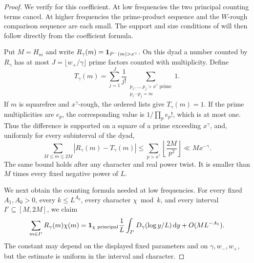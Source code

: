 \begin{proof}
We verify  for this
coefficient.  At low frequencies the two principal counting terms
cancel.  At higher frequencies the prime-product sequence and the
\(W\)-rough comparison sequence are each small.  The support and size
conditions of  will then follow
directly from the coefficient formula.

Put \(M=H_m\) and write \(R_\gamma(m)=\mathbf{1}_{P^-(m)>x^\gamma}\).
On this dyad a number counted by \(R_\gamma\) has at most
\(J=\lfloor w_+/\gamma\rfloor\) prime factors counted with multiplicity.
Define
\[
 T_\gamma(m)=\sum_{j=1}^{J}\frac1{j!}
       \sum_{\substack{p_1,\ldots,p_j>x^\gamma\text{ prime}\\
                       p_1\cdots p_j=m}}1.
\]
If \(m\) is squarefree and \(x^\gamma\)-rough, the ordered lists give
\(T_\gamma(m)=1\).  If the prime multiplicities are \(e_p\), the
corresponding value is \(1/\prod_p e_p!\), which is at most one.
Thus the difference is supported on a square of a prime exceeding
\(x^\gamma\), and, uniformly for every subinterval of the dyad,
\begin{equation}\label{eq:rough-convolution-square-error}
 \sum_{M\le m\le2M}|R_\gamma(m)-T_\gamma(m)|
 \le\sum_{p>x^\gamma}\left\lfloor\frac{2M}{p^2}\right\rfloor
 \ll Mx^{-\gamma}.
\end{equation}
The same bound holds after any character and real power twist.  It is
smaller than \(M\) times every fixed negative power of \(L\).

We next obtain the counting formula needed at low frequencies.  For
every fixed \(A_1,A_0>0\), every \(k\le L^{A_0}\), every character
\(\chi\bmod k\), and every interval \(I'\subseteq[M,2M]\), we claim
\begin{equation}\label{eq:rough-convolution-low-count}
 \sum_{m\in I'}R_\gamma(m)\chi(m)
 =\mathbf{1}_{\chi\text{ principal}}\frac1L
       \int_{I'}D_\gamma(\log y/L)\,\mathrm{d} y+O(M L^{-A_1}).
\end{equation}
The constant may depend on the displayed fixed parameters and on
\(\gamma,w_-,w_+\), but the estimate is uniform in the interval and
character.


\end{proof}
